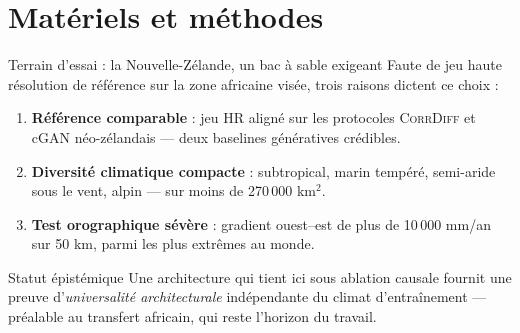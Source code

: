 \documentclass[aspectratio=169,10pt]{beamer}
\newcommand{\CorrDiff}{\textsc{CorrDiff}}
\begin{document}
\section{Matériels et méthodes}

\begin{frame}{Terrain d'essai : la Nouvelle-Zélande, un bac à sable exigeant}
  Faute de jeu haute résolution de référence sur la zone africaine visée, trois raisons
  dictent ce choix :
  \begin{enumerate}
    \item \textbf{Référence comparable} : jeu HR aligné sur les protocoles \CorrDiff{}
          et cGAN néo-zélandais --- deux baselines génératives crédibles.
    \item \textbf{Diversité climatique compacte} : subtropical, marin tempéré, semi-aride
          sous le vent, alpin --- sur moins de 270\,000 km$^2$.
    \item \textbf{Test orographique sévère} : gradient ouest--est de plus de
          \alert{10\,000 mm/an sur 50 km}, parmi les plus extrêmes au monde.
  \end{enumerate}
  \vspace{0.2cm}
  \begin{block}{Statut épistémique}
    \small Une architecture qui tient ici sous ablation causale fournit une preuve
    d'\emph{universalité architecturale} indépendante du climat d'entraînement ---
    préalable au transfert africain, qui reste l'horizon du travail.
  \end{block}
\end{frame}
\end{document}
